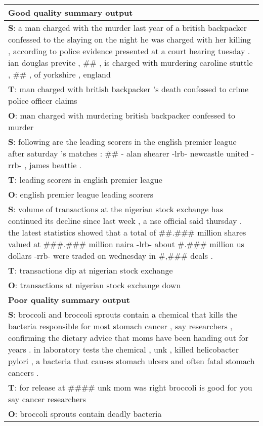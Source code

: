 \documentclass[11pt]{article}
\begin{document}
\begin{table}
\begin{center}
{\small
\begin{tabular}{|p{7.5cm}|}
\hline
{\bf Good quality summary output} \\
\hline
{\bf S}: a man charged with the murder last year of a british backpacker confessed to the slaying on the night he was charged with her killing , according to police evidence presented at a court hearing tuesday .  ian douglas previte , \#\# , is charged with murdering caroline stuttle , \#\# , of yorkshire , england\\ 
{\bf T}: man charged with british backpacker 's death confessed to crime police officer claims \\
{\bf O}: man charged with murdering british backpacker confessed to murder \\
 \hline
{\bf S}: following are the leading scorers in the english premier league after saturday 's matches : \#\# - alan shearer -lrb- newcastle united -rrb- , james beattie .\\
{\bf T}: leading scorers in english premier league \\
{\bf O}: english premier league leading scorers \\
\hline
{\bf S}: volume of transactions at the nigerian stock exchange has continued its decline since last week , a nse official said thursday .  the latest statistics showed that a total of \#\#.\#\#\# million shares valued at \#\#\#.\#\#\# million naira -lrb- about \#.\#\#\# million us dollars -rrb- were traded on wednesday in \#,\#\#\# deals .\\
{\bf T}: transactions dip at nigerian stock exchange \\
{\bf O}: transactions at nigerian stock exchange down \\
\hline
{\bf Poor quality summary output} \\
\hline
{\bf S}: broccoli and broccoli sprouts contain a chemical that kills the bacteria responsible for most stomach cancer , say researchers , confirming the dietary advice that moms have been handing out for years . in laboratory tests the chemical , unk , killed helicobacter pylori , a bacteria that causes stomach ulcers and often fatal stomach cancers . \\
{\bf T}:  for release at \#\#\#\# unk mom was right broccoli is good for you say cancer researchers \\
{\bf O}: broccoli sprouts contain deadly bacteria \\

\end{tabular}}
\end{center}
\end{table}
\end{document}
